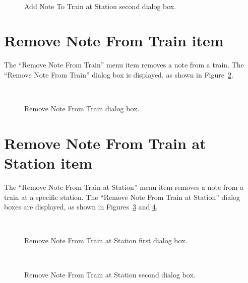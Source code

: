\begin{figure} 
\begin{centering} 
\\
\caption{Add Note To Train at Station second dialog box.} 
\label{fig:addNoteToTrainAtStation2}
\end{centering} 
\end{figure}

\section{Remove Note From Train item} 

The ``Remove Note From Train'' menu item removes a note from a train.
The ``Remove Note From Train'' dialog box is displayed, as shown in
Figure~\ref{fig:removeNoteFromTrain}.

\begin{figure}
\begin{centering}
\\
\caption{Remove Note From Train dialog box.}
\label{fig:removeNoteFromTrain}
\end{centering}
\end{figure}

\section{Remove Note From Train at Station item}

The ``Remove Note From Train at Station'' menu item removes a note from
a train at a specific station. The ``Remove Note From Train at
Station'' dialog boxes are displayed, as shown in
Figures~\ref{fig:removeNoteFromTrainAtStation1} and
\ref{fig:removeNoteFromTrainAtStation2}.

\begin{figure} 
\begin{centering} 
\\
\caption{Remove Note From Train at Station first dialog box.} 
\label{fig:removeNoteFromTrainAtStation1}
\end{centering} 
\end{figure}

\begin{figure} 
\begin{centering} 
\\
\caption{Remove Note From Train at Station second dialog box.} 
\label{fig:removeNoteFromTrainAtStation2}
\end{centering} 
\end{figure}


